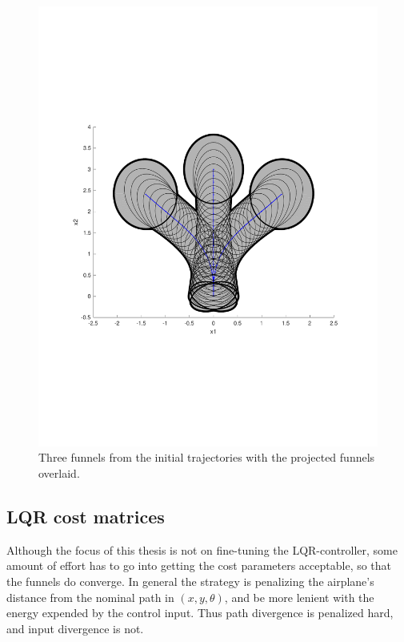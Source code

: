 \begin{figure}
  \centering \includegraphics[scale=.5, trim={2cm 6cm 2cm
    6cm}]{figures/experiments/sample-funnel-overlay} \caption{Three funnels from
    the initial trajectories with the projected funnels overlaid.}
  \label{fig:sample-funnel-overlay}
\end{figure}

\subsection{LQR cost matrices}
\label{subsec:lqr-cost}

Although the focus of this thesis is not on fine-tuning the \ac{LQR}-controller,
some amount of effort has to go into getting the cost parameters acceptable, so
that the funnels do converge. In general the strategy is penalizing the
airplane's distance from the nominal path in \((x,y,\theta)\), and be more
lenient with the energy expended by the control input. Thus path divergence is
penalized hard, and input divergence is not.

